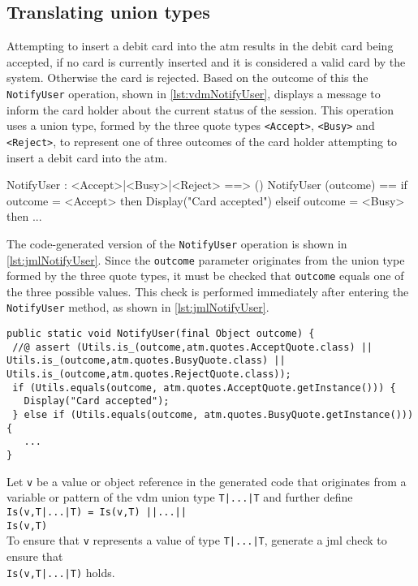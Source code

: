 \subsection{Translating union types}
\label{sec:unions}

Attempting to insert a debit card into the \ac{atm} results in the
debit card being accepted, if no card is currently inserted and it is
considered a valid card by the system. Otherwise the card is
rejected. Based on the outcome of this the \texttt{NotifyUser}
operation, shown in \autoref{lst:vdmNotifyUser}, displays a message to
inform the card holder about the current status of the session. This
operation uses a union type, formed by the three quote types
\texttt{<Accept>}, \texttt{<Busy>} and \texttt{<Reject>}, to represent
one of three outcomes of the card holder attempting to insert a debit
card into the \ac{atm}.

\begin{vdmsl}[style=customVdm,caption={Operation used to notify a
\ac{atm} user.},label={lst:vdmNotifyUser}]
NotifyUser : <Accept>|<Busy>|<Reject> ==> ()
NotifyUser (outcome) ==
if outcome = <Accept> then
  Display("Card accepted")
elseif outcome = <Busy> then
  ...
\end{vdmsl}

\noindent The code-generated version of the \texttt{NotifyUser} operation is
shown in \autoref{lst:jmlNotifyUser}. Since the \texttt{outcome}
parameter originates from the union type formed by the three quote
types, it must be checked that \texttt{outcome} equals one of the three
possible values. This check is performed immediately after entering
the \texttt{NotifyUser} method, as shown in
\autoref{lst:jmlNotifyUser}.

\begin{lstlisting}[style=customJml,caption={Code-generated version of
the \texttt{NotifyUser} operation.},label={lst:jmlNotifyUser}]
public static void NotifyUser(final Object outcome) {
 //@ assert (Utils.is_(outcome,atm.quotes.AcceptQuote.class) || Utils.is_(outcome,atm.quotes.BusyQuote.class) || Utils.is_(outcome,atm.quotes.RejectQuote.class));
 if (Utils.equals(outcome, atm.quotes.AcceptQuote.getInstance())) {
   Display("Card accepted");
 } else if (Utils.equals(outcome, atm.quotes.BusyQuote.getInstance())){
   ...
}
\end{lstlisting}

 {Let \texttt{v} be a value or
  object reference in the generated code that originates from a
  variable or pattern of the \ac{vdm} union type
  \texttt{T|...|T} and further define\\
  \texttt{Is(v,T|...|T) = Is(v,T) ||...||\\Is(v,T)}\\
  To ensure that \texttt{v} represents a value of type
  \texttt{T|...|T}, generate a \ac{jml}
  check to ensure that\\
  \texttt{Is(v,T|...|T)} holds.}

